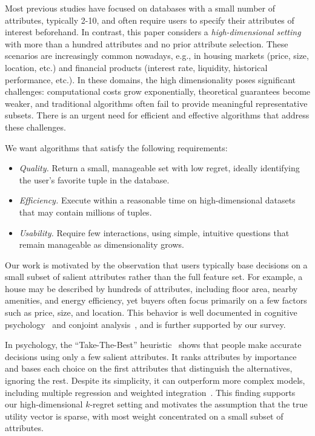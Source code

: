 Most previous studies have focused on databases with a small number of attributes, typically 2-10, and often require users to specify their attributes of interest beforehand. In contrast, this paper considers a \textit{high-dimensional setting} with more than a hundred attributes and no prior attribute selection. These scenarios are increasingly common nowadays, e.g., in housing markets (price, size, location, etc.) and financial products (interest rate, liquidity, historical performance, etc.). In these domains, the high dimensionality poses significant challenges: computational costs grow exponentially, theoretical guarantees become weaker, and traditional algorithms often fail to provide meaningful representative subsets. There is an urgent need for efficient and effective algorithms that address these challenges.

We want algorithms that satisfy the following requirements:

\begin{itemize}[beginpenalty=10000]
    \item \textit{Quality.} Return a small, manageable set with low regret, ideally identifying the user’s favorite tuple in the database.
    
    \item \textit{Efficiency.} Execute within a reasonable time on high-dimensional datasets that may contain millions of tuples.
    
    \item \textit{Usability.} Require few interactions, using simple, intuitive questions that remain manageable as dimensionality grows.
\end{itemize}

Our work is motivated by the observation that users typically base decisions on a small subset of salient attributes rather than the full feature set. For example, a house may be described by hundreds of attributes, including floor area, nearby amenities, and energy efficiency, yet buyers often focus primarily on a few factors such as price, size, and location. This behavior is well documented in cognitive psychology~\cite{GG96, GA12, MH99, GG99} and conjoint analysis~\cite{WX22, SC05, TK03, DMW12}, and is further supported by our survey.

In psychology, the “Take-The-Best” heuristic~\cite{GG96, GA12} shows that people make accurate decisions using only a few salient attributes. It ranks attributes by importance and bases each choice on the first attributes that distinguish the alternatives, ignoring the rest. Despite its simplicity, it can outperform more complex models, including multiple regression and weighted integration~\cite{MH99, GG99}. This finding supports our high-dimensional $k$-regret setting and motivates the assumption that the true utility vector is sparse, with most weight concentrated on a small subset of attributes.

